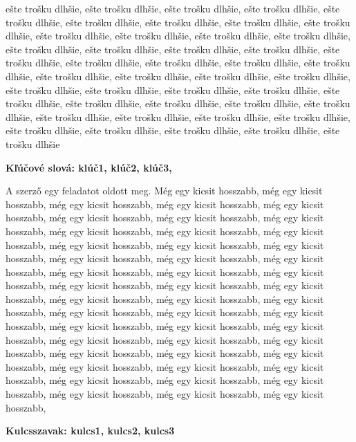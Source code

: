 \documentclass[a4paper,oneside,onecolumn,12pt]{LegrandOrangeBook}
\begin{document}
ešte trošku dlhšie, ešte trošku dlhšie, ešte trošku dlhšie, ešte trošku dlhšie, ešte trošku dlhšie, ešte trošku dlhšie, ešte trošku dlhšie, ešte trošku dlhšie, ešte trošku dlhšie, ešte trošku dlhšie, ešte trošku dlhšie, ešte trošku dlhšie, ešte trošku dlhšie, ešte trošku dlhšie, ešte trošku dlhšie, ešte trošku dlhšie, ešte trošku dlhšie, ešte trošku dlhšie, ešte trošku dlhšie, ešte trošku dlhšie, ešte trošku dlhšie, ešte trošku dlhšie, ešte trošku dlhšie, ešte trošku dlhšie, ešte trošku dlhšie, ešte trošku dlhšie, ešte trošku dlhšie, ešte trošku dlhšie, ešte trošku dlhšie, ešte trošku dlhšie, ešte trošku dlhšie, ešte trošku dlhšie, ešte trošku dlhšie, ešte trošku dlhšie, ešte trošku dlhšie, ešte trošku dlhšie, ešte trošku dlhšie, ešte trošku dlhšie, ešte trošku dlhšie, ešte trošku dlhšie, ešte trošku dlhšie, ešte trošku dlhšie, ešte trošku dlhšie, ešte trošku dlhšie

\textbf{Kľúčové slová: klúč1, klúč2, klúč3, }
\pagebreak

\label{sec:absztrakt}

A szerző egy feladatot oldott meg. Még egy kicsit hosszabb, még egy kicsit hosszabb, még egy kicsit hosszabb, még egy kicsit hosszabb, még egy kicsit hosszabb, még egy kicsit hosszabb, még egy kicsit hosszabb, még egy kicsit hosszabb, még egy kicsit hosszabb, még egy kicsit hosszabb, még egy kicsit hosszabb, még egy kicsit hosszabb, még egy kicsit hosszabb, még egy kicsit hosszabb, még egy kicsit hosszabb, még egy kicsit hosszabb, még egy kicsit hosszabb, még egy kicsit hosszabb, még egy kicsit hosszabb, még egy kicsit hosszabb, még egy kicsit hosszabb, még egy kicsit hosszabb, még egy kicsit hosszabb, még egy kicsit hosszabb, még egy kicsit hosszabb, még egy kicsit hosszabb, még egy kicsit hosszabb, még egy kicsit hosszabb, még egy kicsit hosszabb, még egy kicsit hosszabb, még egy kicsit hosszabb, még egy kicsit hosszabb, még egy kicsit hosszabb, még egy kicsit hosszabb, még egy kicsit hosszabb, még egy kicsit hosszabb, még egy kicsit hosszabb, még egy kicsit hosszabb, még egy kicsit hosszabb, még egy kicsit hosszabb, még egy kicsit hosszabb, még egy kicsit hosszabb, még egy kicsit hosszabb, még egy kicsit hosszabb, még egy kicsit hosszabb, még egy kicsit hosszabb, még egy kicsit hosszabb, 

\textbf{Kulcsszavak: kulcs1, kulcs2, kulcs3}

\pagebreak
\end{document}
